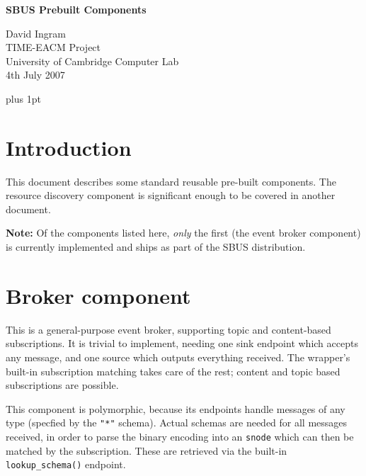 \documentclass[12pt,a4paper,twoside]{article}
\renewcommand{\_}{\texttt{\symbol{95}}}
\begin{document}
\centerline{\textbf{\LARGE SBUS Prebuilt Components}}
\begin{center} \large
David Ingram\\
TIME-EACM Project\\
University of Cambridge Computer Lab\\
4th July 2007\\
\end{center}

{ \parskip 1mm plus 1pt \tableofcontents }
\pagestyle{fancy}

\section{Introduction}

This document describes some standard reusable pre-built components.
The resource discovery component is significant enough to be covered
in another document.

\textbf{Note:} Of the components listed here, \textit{only} the first
(the event broker component) is currently implemented and ships
as part of the SBUS distribution.

\section{Broker component}
\label{broker}

This is a general-purpose event broker, supporting topic and content-based
subscriptions. It is trivial to implement, needing one sink endpoint which
accepts any message, and one source which outputs everything
received. The wrapper's built-in subscription matching takes care of
the rest; content and topic based subscriptions are possible.

This component is polymorphic, because its endpoints handle
messages of any type (specfied by the \verb^"*"^ schema).
Actual schemas are needed for all messages received, in order to parse
the binary encoding into an \verb^snode^ which can then be matched
by the subscription. These are retrieved via the built-in
\verb^lookup_schema()^ endpoint.
\end{document}
